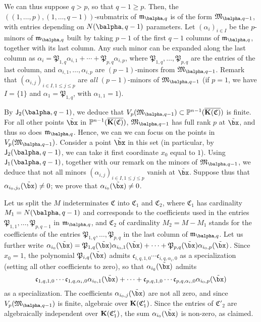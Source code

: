 \documentclass[12pt]{article}
\begin{document}
We can thus suppose $q > p$, so that $q-1 \ge p$.  Then, the
$((1,\dots,p),(1,\dots,q-1))$-submatrix of $\mathfrak{m}_{\balpha,q}$ is
of the form $\mathfrak{M}_{\balpha,q-1}$, with entries depending on
$N(\balpha,q-1)$ parameters.  Let $(\alpha_i)_{i \in I}$ be the $p$-minors
of $\mathfrak{m}_{\balpha,q}$ built by taking $p-1$ of the first $q-1$
columns of $\mathfrak{m}_{\balpha,q}$, together with its last column.
Any such minor can be expanded along the last column as $\alpha_i =
\mathfrak{P}_{1,q} \alpha_{i,1} + \cdots + \mathfrak{P}_{p,q}
\alpha_{i,p}$, where $\mathfrak{P}_{1,q},\dots,\mathfrak{P}_{p,q}$ are
the entries of the last column, and $\alpha_{i,1},\dots,\alpha_{i,p}$
are $(p-1)$-minors from $\mathfrak{M}_{\balpha,q-1}$. Remark that
$(\alpha_{i,j})_{i \in I, 1 \le j \le p}$ are {\em all} $(p-1)$-minors
of $\mathfrak{M}_{\balpha,q-1}$ (if $p=1$, we have $I=\{1\}$ and
$\alpha_1=\mathfrak{P}_{1,q}$, with $\alpha_{1,1}=1$).

By $\assI_2(\balpha,q-1)$, we deduce that $V_p(\mathfrak{M}_{\balpha,q-1})
\subset \P^{n-1}(\KKCbar)$ is finite. For all other points $\tilde\bx$
in $\mathbb{P}^{n-1}(\overline{\mathbf{K}(\mathfrak{C})})$, $\mathfrak{M}_{\balpha,q-1}$ has full rank $p$ at
$\tilde\bx$, and thus so does $\mathfrak{m}_{\balpha,q}$. Hence, we can we
can focus on the points in $V_p(\mathfrak{M}_{\balpha,q-1})$.  Consider a
point $\tilde\bx$ in this set (in particular, by $\assI_2(\balpha,q-1)$,
we can take it first coordinate $x_0$ equal to $1$). Using $\assI_1(\balpha,q-1)$, together with our remark on the minors of
$\mathfrak{M}_{\balpha,q-1}$, we deduce that not all minors
$(\alpha_{i,j})_{i \in I, 1 \le j \le p}$ vanish at
$\tilde\bx$. Suppose thus that $\alpha_{i_0,j_0}(\tilde\bx) \ne 0$; we
prove that $\alpha_{i_0}(\tilde\bx) \ne 0$.

Let us split the $M$ indeterminates $\mathfrak{C}$ into
$\mathfrak{C}_1$ and $\mathfrak{C}_2$, where $\mathfrak{C}_1$ has
cardinality $M_1=N(\balpha,q-1)$ and corresponds to the coefficients used
in the entries $\mathfrak{P}_{1,1},\dots,\mathfrak{P}_{p,q-1}$ in
$\mathfrak{m}_{\balpha,q}$, and $\mathfrak{C}_2$ of cardinality
$M_2=M-M_1$ stands for the coefficients of the entries
$\mathfrak{P}_{1,q},\dots,\mathfrak{P}_{p,q}$ in the last column of
$\mathfrak{m}_{\balpha,q}$.  Let us further write
$\alpha_{i_0}(\tilde\bx)= \mathfrak{P}_{1,q}(\tilde\bx)
\alpha_{i_0,1}(\tilde\bx) + \cdots + \mathfrak{P}_{p,q}(\tilde\bx)
\alpha_{i_0,p}(\tilde\bx)$.  Since $x_0=1$, the
polynomial $\mathfrak{P}_{i,q}(\tilde\bx)$ admits
$\mathfrak{c}_{i,q,1,0}\cdots \mathfrak{c}_{i,q,\alpha_i,0}$ 
as a specialization (setting all other coefficients to zero), so that
$\alpha_{i_0}(\tilde\bx)$ admits 
$$\mathfrak{c}_{1,q,1,0}\cdots \mathfrak{c}_{1,q,\alpha_i,0}
\alpha_{i_0,1}(\tilde\bx) + \cdots + \mathfrak{c}_{p,q,1,0}\cdots
\mathfrak{c}_{p,q,\alpha_i,0} \alpha_{i_0,p}(\tilde\bx)$$ as a
specialization. The coefficients
$\alpha_{i_0,j}(\tilde\bx)$ are not all zero, and since
$V_p(\mathfrak{M}_{\balpha,q-1})$ is finite, algebraic over
$\mathbf{K}(\mathfrak{C}'_1)$. Since the entries of $\mathfrak{C}'_2$ are
algebraically independent over $\mathbf{K}(\mathfrak{C}'_1)$, the sum
$\alpha_{i_0}(\tilde\bx)$ is non-zero, as claimed.
\end{document}
